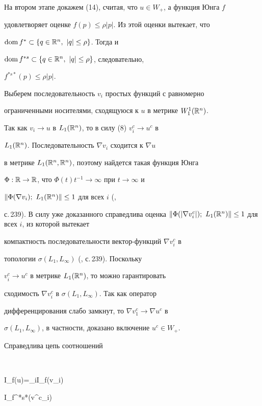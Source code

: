  


На втором этапе докажем (14), считая, что $u\in W_+$, а функция Юнга $f$


удовлетворяет оценке $f(p)\le\rho|p|$. Из этой оценки вытекает, что 


$\dom f^*\subset\{q\in\Bbb R^n,\ |q|\le\rho\}$. Тогда и 


$\dom f^{*s}\subset\{q\in\Bbb R^n,\ |q|\le\rho\}$, следовательно, 


$f^{*s*}(p)\le\rho|p|$. 


 


Выберем последовательность $v_i$ простых функций с равномерно 


ограниченными носителями, сходящуюся к $u$ в метрике $W^1_1(\Bbb R^n)$. 


Так как $v_i\to u$ в $L_1(\Bbb R^n)$, то в силу (8) $v^c_i\to u^c$ в 


$L_1(\Bbb R^n)$. Последовательность $\nabla v_i$ сходится к $\nabla u$ 


в метрике $L_1(\Bbb R^n,\Bbb R^n)$, поэтому найдется такая функция Юнга 


$\Phi:\Bbb R\to\Bbb R$, что $\Phi(t)t^{-1}\to\infty$ при $t\to\infty$ и 


$\|\Phi(\nabla v_i);\ L_1(\Bbb R^n)\|\le 1$ для всех $i$ (\cite{8}, 


с.\,239). В силу уже доказанного справедлива оценка $\|\Phi(|\nabla 


v^c_i|);\ L_1(\Bbb R^n)\|\le 1$ для всех $i$, из которой вытекает 


компактность последовательности вектор-функций $\nabla v^c_i$ в 


топологии $\sigma(L_1,L_\infty)$ (\cite{8}, с.\,239). Поскольку 


$v^c_i\to u^c$ в метрике $L_1(\Bbb R^n)$, то можно гарантировать 


сходимость $\nabla v^c_i$ в $\sigma(L_1,L_\infty)$. Так как оператор 


дифференцирования слабо замкнут, то $\nabla v^c_1\to\nabla u^c$ в 


$\sigma(L_1,L_\infty)$, в частности, доказано включение $u^c\in W_+$. 


 


Справедлива цепь соотношений 


$$ 


I_f(\nabla u)=\lim_{i\to\infty}I_f(\nabla v_i)\ge 


I_{f^{*s*}}(\nabla v^c_i)\ge 


